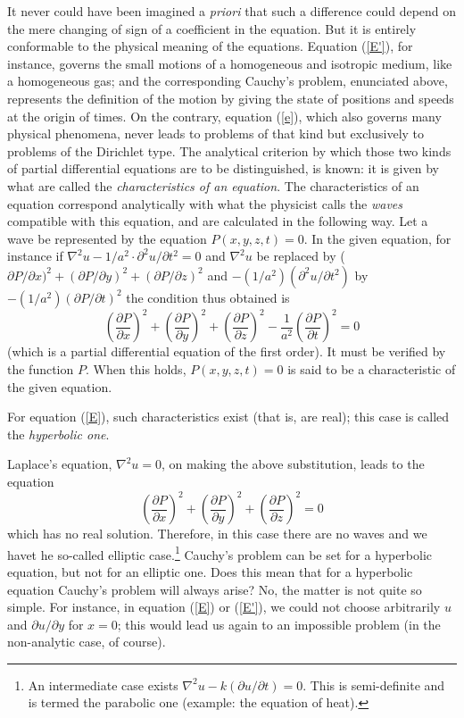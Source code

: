 \documentclass[12pt,oneside]{book}
\newcommand{\iit}[1]{\textit{#1}}
\begin{document}
It never could have been imagined a \iit{priori} that such a difference could depend on the mere changing of sign of a coefficient in the equation. But it is entirely conformable to the physical meaning of the equations. Equation (\ref{E'}), for instance, governs the small motions of a homogeneous and isotropic medium, like a homogeneous gas; and the corresponding Cauchy's problem, enunciated above, represents the definition of the motion by giving the state of positions and speeds at the origin of times. On the contrary, equation (\ref{e}), which also governs many physical phenomena, never leads to problems of that kind but exclusively to problems of the Dirichlet type. The analytical criterion by which those two kinds of partial differential equations are to be distinguished, is known: it is given by what are called the \iit{characteristics of an equation}. The characteristics of an equation correspond analytically with what the physicist calls the \iit{waves} compatible with this equation, and are calculated in the following way. Let a wave be represented by the equation $P(x,y,z,t)=0$. In the given equation, for instance if $\nabla^2u-1/a^2\cdot\partial^2u/\partial t^2=0$ and $\nabla^2u$ be replaced by ($\partial P/\partial x)^2+(\partial P/\partial y)^2+(\partial P/\partial z)^2$ and $-(1/a^2)(\partial^2u/\partial t^2)$ by $-(1/a^2)(\partial P/\partial t)^2$ the condition thus obtained is 
\begin{equation*}
    \left(\frac{\partial P}{\partial x}\right)^2+\left(\frac{\partial P}{\partial y}\right)^2+\left(\frac{\partial P}{\partial z}\right)^2-\frac{1}{a^2}\left(\frac{\partial P}{\partial t}\right)^2=0 
\end{equation*}
(which is a partial differential equation of the first order). It must be verified by the function $P$. When this holds, $P(x,y,z,t)=0$ is said to be a characteristic of the given equation. \par 

For equation (\ref{E}), such characteristics exist (that is, are real); this case is called the \iit{hyperbolic one}. \par 

Laplace's equation, $\nabla^2u=0$, on making the above substitution, leads to the equation
\begin{equation*}
    \left(\frac{\partial P}{\partial x}\right)^2 + \left(\frac{\partial P}{\partial y}\right)^2 + \left(\frac{\partial P}{\partial z}\right)^2 = 0
\end{equation*}
which has no real solution. Therefore, in this case there are no waves and we havet he so-called elliptic case.\footnote{An intermediate case exists $\nabla^2u-k(\partial u/\partial t)=0$. This is semi-definite and is termed the parabolic one (example: the equation of heat).} Cauchy's problem can be set for a hyperbolic equation, but not for an elliptic one. Does this mean that for a hyperbolic equation Cauchy's problem will always arise? No, the matter is not quite so simple. For instance, in equation (\ref{E}) or (\ref{E'}), we could not choose arbitrarily $u$ and $\partial u/\partial y$ for $x=0$; this would lead us again to an impossible problem (in the non-analytic case, of course). \par 
\end{document}
